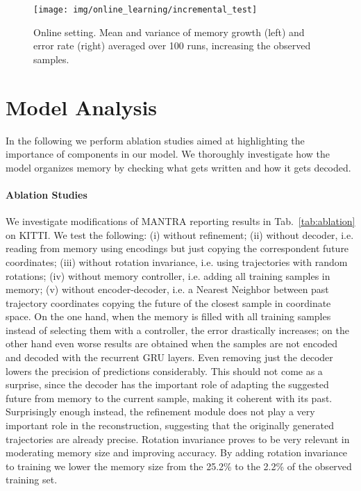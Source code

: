 \documentclass[10pt,twocolumn,letterpaper]{article}
\begin{document}
\begin{figure}
	\centering
\texttt{[image: img/online\_learning/incremental\_test]}	
	\caption{Online setting. Mean and variance of memory growth (left) and error rate (right) averaged over 100 runs, increasing the observed samples.}
	\label{fig:online}
	\vspace{-10pt}
\end{figure}



\section{Model Analysis}

In the following we perform ablation studies aimed at highlighting the importance of components in our model. We thoroughly investigate how the model organizes memory by checking what gets written and how it gets decoded.

\vspace{-10pt}
\paragraph{Ablation Studies}
We investigate modifications of MANTRA reporting results in Tab.~\ref{tab:ablation} on KITTI. We test the following: (i) without refinement; (ii) without decoder, i.e. reading from memory using encodings but just copying the correspondent future coordinates; (iii) without rotation invariance, i.e. using trajectories with random rotations; (iv) without memory controller, i.e. adding all training samples in memory; (v) without encoder-decoder, i.e. a Nearest Neighbor between past trajectory coordinates copying the future of the closest sample in coordinate space.
On the one hand, when the memory is filled with all training samples instead of selecting them with a controller, the error drastically increases; on the other hand even worse results are obtained when the samples are not encoded and decoded with the recurrent GRU layers. Even removing just the decoder lowers the precision of predictions considerably. This should not come as a surprise, since the decoder has the important role of adapting the suggested future from memory to the current sample, making it coherent with its past. 
Surprisingly enough instead, the refinement module does not play a very important role in the reconstruction, suggesting that the originally generated trajectories are already precise. Rotation invariance proves to be very relevant in moderating memory size and improving accuracy. By adding rotation invariance to training we lower the memory size from the 25.2\% to the 2.2\% of the observed training set. 
\end{document}
